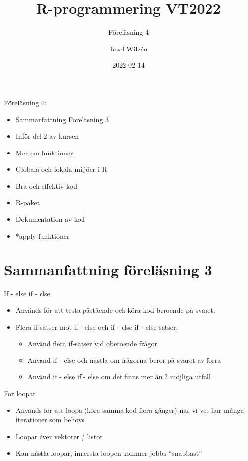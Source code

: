 \documentclass[
  11pt,
  ignorenonframetext,
]{beamer}
\title{R-programmering VT2022}
\subtitle{Föreläsning 4}
\author{Josef Wilzén}
\date{2022-02-14}
\institute{Linköpings Universitet}
\providecommand{\tightlist}{%
  \setlength{\itemsep}{0pt}\setlength{\parskip}{0pt}}
\begin{document}
\frame{\titlepage}

\begin{frame}{Föreläsning 4:}
\protect\hypertarget{fuxf6reluxe4sning-4}{}
\begin{itemize}
\tightlist
\item
  Sammanfattning Föreläsning 3
\item
  Inför del 2 av kursen
\item
  Mer om funktioner
\item
  Globala och lokala miljöer i R
\item
  Bra och effektiv kod
\item
  R-paket
\item
  Dokumentation av kod
\item
  *apply-funktioner
\end{itemize}
\end{frame}

\hypertarget{sammanfattning-fuxf6reluxe4sning-3}{%
\section{Sammanfattning föreläsning
3}\label{sammanfattning-fuxf6reluxe4sning-3}}

\begin{frame}{If - else if - else}
\protect\hypertarget{if---else-if---else}{}
\begin{itemize}
\tightlist
\item
  Används för att testa påstående och köra kod beroende på svaret.
\item
  Flera if-satser mot if - else och if - else if - else satser:

  \begin{itemize}
  \tightlist
  \item
    Använd flera if-satser vid oberoende frågor
  \item
    Använd if - else och nästla om frågorna beror på svaret av förra
  \item
    Använd if - else if - else om det finns mer än 2 möjliga utfall
  \end{itemize}
\end{itemize}
\end{frame}

\begin{frame}{For loopar}
\protect\hypertarget{for-loopar}{}
\begin{itemize}
\tightlist
\item
  Används för att loopa (köra samma kod flera gånger) när vi vet hur
  många iterationer som behövs.
\item
  Loopar över vektorer / listor
\item
  Kan nästla loopar, innersta loopen kommer jobba ``snabbast''
\end{itemize}
\end{frame}
\end{document}
